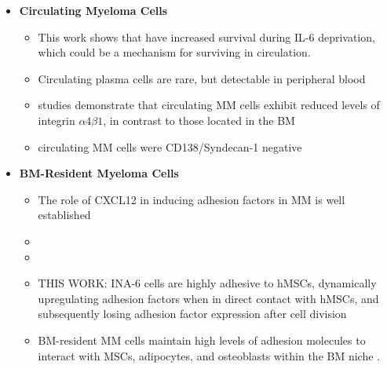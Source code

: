\begin{itemize}
      \item \textbf{Circulating Myeloma Cells}
            \begin{itemize}
                  \item This work shows that \nMAina have increased survival
                        during IL-6 deprivation, which could be a mechanism for
                        surviving in circulation.
                  \item Circulating plasma cells are rare, but detectable in
                        peripheral blood
                        \cite{witzigDetectionMyelomaCells1996}
                  \item studies demonstrate that circulating \ac{MM} cells
                        exhibit reduced levels of integrin $\alpha4\beta1$, in
                        contrast to those located in the \ac{BM}
                        \cite{paivaDetailedCharacterizationMultiple2013,
                              paivaCompetitionClonalPlasma2011}
                  \item circulating MM cells were CD138/Syndecan-1 negative
                        \cite{akhmetzyanovaDynamicCD138Surface2020}

            \end{itemize}

      \item \textbf{BM-Resident Myeloma Cells}
            \begin{itemize}
                  \item The role of CXCL12  in inducing adhesion factors in MM is well established
                  \item
                  \item
                  \item THIS WORK: INA-6 cells are highly adhesive to hMSCs, dynamically
                        upregulating adhesion factors when in direct contact with
                        hMSCs, and subsequently losing adhesion factor expression after
                        cell division

                  \item BM-resident MM cells maintain high levels of adhesion
                        molecules to interact with MSCs, adipocytes, and osteoblasts
                        within the BM niche \cite{bouzerdanAdhesionMoleculesMultiple2022, burgerGp130RasMediated2001, chatterjeePresenceBoneMarrow2002}.
            \end{itemize}

\end{itemize}


